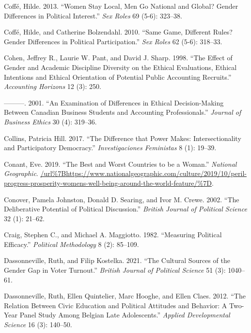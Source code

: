 \documentclass[
  letterpaper,
  DIV=11,
  numbers=noendperiod]{scrreprt}
\newlength{\cslhangindent}
\newenvironment{CSLReferences}[2] %
 {\begin{list}{}{%
  \setlength{\itemindent}{0pt}
  \setlength{\leftmargin}{0pt}
  \setlength{\parsep}{0pt}
  \ifodd #1
   \setlength{\leftmargin}{\cslhangindent}
   \setlength{\itemindent}{-1\cslhangindent}
  \fi
  \setlength{\itemsep}{#2\baselineskip}}}
 {\end{list}}
\begin{document}
\begin{CSLReferences}{1}{0}
Coffé, Hilde. 2013. {``{Women Stay Local, Men Go National and Global?
Gender Differences in Political Interest}.''} \emph{Sex Roles} 69 (5-6):
323--38.

Coffé, Hilde, and Catherine Bolzendahl. 2010. {``{Same Game, Different
Rules? Gender Differences in Political Participation}.''} \emph{Sex
Roles} 62 (5-6): 318--33.

Cohen, Jeffrey R., Laurie W. Pant, and David J. Sharp. 1998. {``{The
Effect of Gender and Academic Discipline Diversity on the Ethical
Evaluations, Ethical Intentions and Ethical Orientation of Potential
Public Accounting Recruits}.''} \emph{Accounting Horizons} 12 (3): 250.

---------. 2001. {``{An Examination of Differences in Ethical
Decision-Making Between Canadian Business Students and Accounting
Professionals}.''} \emph{Journal of Business Ethics} 30 (4): 319--36.

Collins, Patricia Hill. 2017. {``{The Difference that Power Makes:
Intersectionality and Participatory Democracy}.''} \emph{Investigaciones
Feministas} 8 (1): 19--39.

Conant, Eve. 2019. {``{The Best and Worst Countries to be a Woman}.''}
\emph{National Geographic}.
\url{/url\%7Bhttps://www.nationalgeographic.com/culture/2019/10/peril-progress-prosperity-womens-well-being-around-the-world-feature/\%7D}.

Conover, Pamela Johnston, Donald D. Searing, and Ivor M. Crewe. 2002.
{``{The Deliberative Potential of Political Discussion}.''}
\emph{British Journal of Political Science} 32 (1): 21--62.

Craig, Stephen C., and Michael A. Maggiotto. 1982. {``{Measuring
Political Efficacy}.''} \emph{Political Methodology} 8 (2): 85--109.

Dassonneville, Ruth, and Filip Kostelka. 2021. {``{The Cultural Sources
of the Gender Gap in Voter Turnout}.''} \emph{{British Journal of
Political Science}} 51 (3): 1040--61.

Dassonneville, Ruth, Ellen Quintelier, Marc Hooghe, and Ellen Claes.
2012. {``{The Relation Between Civic Education and Political Attitudes
and Behavior: A Two-Year Panel Study Among Belgian Late Adolescents}.''}
\emph{Applied Developmental Science} 16 (3): 140--50.


\end{CSLReferences}
\end{document}
